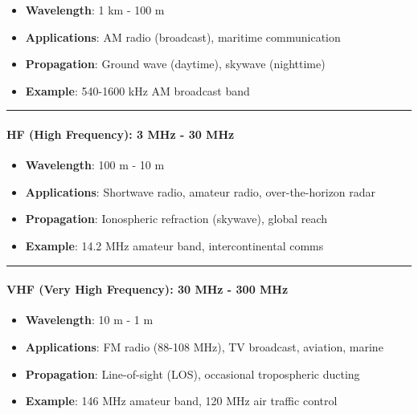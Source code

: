 \begin{itemize}
\tightlist
\item
  \textbf{Wavelength}: 1 km - 100 m
\item
  \textbf{Applications}: AM radio (broadcast), maritime communication
\item
  \textbf{Propagation}: Ground wave (daytime), skywave (nighttime)
\item
  \textbf{Example}: 540-1600 kHz AM broadcast band
\end{itemize}

\begin{center}\rule{0.5\linewidth}{0.5pt}\end{center}

\paragraph{\texorpdfstring{\textbf{HF (High Frequency): 3 MHz - 30
MHz}}{HF (High Frequency): 3 MHz - 30 MHz}}\label{hf-high-frequency-3-mhz---30-mhz}

\begin{itemize}
\tightlist
\item
  \textbf{Wavelength}: 100 m - 10 m
\item
  \textbf{Applications}: Shortwave radio, amateur radio,
  over-the-horizon radar
\item
  \textbf{Propagation}: Ionospheric refraction (skywave), global reach
\item
  \textbf{Example}: 14.2 MHz amateur band, intercontinental comms
\end{itemize}

\begin{center}\rule{0.5\linewidth}{0.5pt}\end{center}

\paragraph{\texorpdfstring{\textbf{VHF (Very High Frequency): 30 MHz -
300
MHz}}{VHF (Very High Frequency): 30 MHz - 300 MHz}}\label{vhf-very-high-frequency-30-mhz---300-mhz}

\begin{itemize}
\tightlist
\item
  \textbf{Wavelength}: 10 m - 1 m
\item
  \textbf{Applications}: FM radio (88-108 MHz), TV broadcast, aviation,
  marine
\item
  \textbf{Propagation}: Line-of-sight (LOS), occasional tropospheric
  ducting
\item
  \textbf{Example}: 146 MHz amateur band, 120 MHz air traffic control
\end{itemize}

